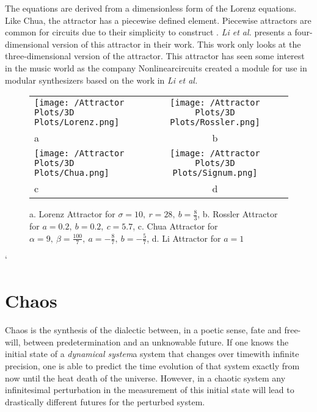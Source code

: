           The equations are derived from a dimensionless form of the Lorenz equations. Like Chua, the attractor
          has a piecewise defined element. Piecewise attractors are common for circuits due to their simplicity
          to construct \cite{item:6}. \textit{Li et al.} presents a four-dimensional version of this attractor
          in their work. This work only looks at the three-dimensional version of the attractor. This attractor
          has seen some interest in the music world as the company Nonlinearcircuits created a module for use
          in modular synthesizers based on the work in \textit{Li et al.}\\

        \begin{figure}[H]
            \centering
            \begin{tabular}{lcc}
                \texttt{[image: /Attractor Plots/3D Plots/Lorenz.png]}&
                \texttt{[image: /Attractor Plots/3D Plots/Rossler.png]}\\
                \hfil a &b\\
                \texttt{[image: /Attractor Plots/3D Plots/Chua.png]}&
                \texttt{[image: /Attractor Plots/3D Plots/Signum.png]}\\
                \hfil c &d\\
            \end{tabular}
            \caption{a. Lorenz Attractor for $\sigma=10, \ r=28, \ b=\frac{8}{3}$, b. Rossler Attractor for $a=0.2, \ b=0.2, \ c=5.7$,
                c. Chua Attractor for $\alpha=9, \ \beta=\frac{100}{7}, \ a=-\frac{8}{7}, \ b=-\frac{5}{7}$, d. Li Attractor for $a=1$}\label{fig:attr}
        \end{figure}

`\section{Chaos}
  \label{sec:chaos}

      Chaos is the synthesis of the dialectic between, in a poetic sense, fate and free-will, between predetermination
      and an unknowable future. If one knows the initial state of a \textit{dynamical
      system}\texttwelveudash a system that changes over time\texttwelveudash with infinite precision, one is
      able to predict the time evolution of that system exactly from now until the heat
      death of the universe. However, in a chaotic system any infinitesimal perturbation in the measurement of this initial state will lead to
      drastically different futures for the perturbed system.\\

